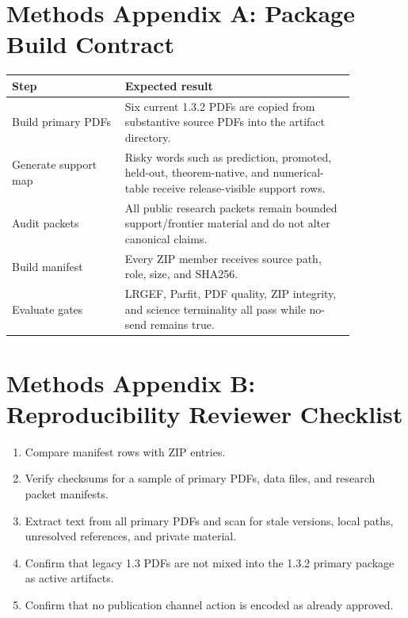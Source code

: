\documentclass[11pt,a4paper]{article}
\begin{document}
\clearpage
\section*{Methods Appendix A: Package Build Contract}
\begin{longtable}{>{\raggedright\arraybackslash}p{0.28\linewidth}>{\raggedright\arraybackslash}p{0.58\linewidth}}
\textbf{Step} & \textbf{Expected result}\\
\hline
Build primary PDFs & Six current 1.3.2 PDFs are copied from substantive source PDFs into the artifact directory.\\
Generate support map & Risky words such as prediction, promoted, held-out, theorem-native, and numerical-table receive release-visible support rows.\\
Audit packets & All public research packets remain bounded support/frontier material and do not alter canonical claims.\\
Build manifest & Every ZIP member receives source path, role, size, and SHA256.\\
Evaluate gates & LRGEF, Parfit, PDF quality, ZIP integrity, and science terminality all pass while no-send remains true.\\
\end{longtable}

\clearpage
\section*{Methods Appendix B: Reproducibility Reviewer Checklist}
\begin{enumerate}
  \item Compare manifest rows with ZIP entries.
  \item Verify checksums for a sample of primary PDFs, data files, and research packet manifests.
  \item Extract text from all primary PDFs and scan for stale versions, local paths, unresolved references, and private material.
  \item Confirm that legacy 1.3 PDFs are not mixed into the 1.3.2 primary package as active artifacts.
  \item Confirm that no publication channel action is encoded as already approved.
\end{enumerate}

\clearpage
\end{document}
